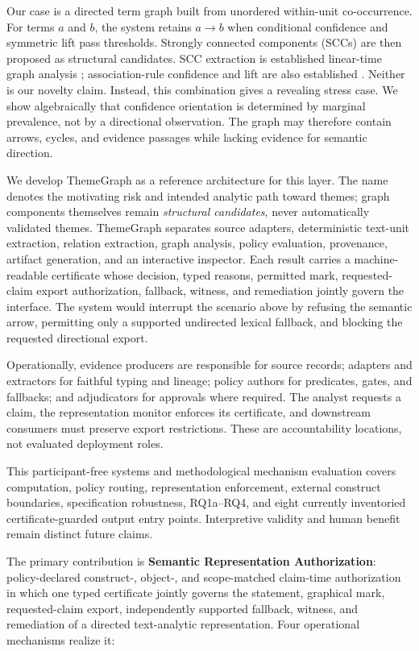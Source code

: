 \documentclass[manuscript,screen,review,anonymous]{acmart}
\begin{document}
Our case is a directed term graph built from unordered within-unit co-occurrence. For terms $a$ and $b$, the system retains $a\rightarrow b$ when conditional confidence and symmetric lift pass thresholds. Strongly connected components (SCCs) are then proposed as structural candidates. SCC extraction is established linear-time graph analysis \cite{tarjan1972}; association-rule confidence and lift are also established \cite{agrawal1993}. Neither is our novelty claim. Instead, this combination gives a revealing stress case. We show algebraically that confidence orientation is determined by marginal prevalence, not by a directional observation. The graph may therefore contain arrows, cycles, and evidence passages while lacking evidence for semantic direction.

We develop ThemeGraph as a reference architecture for this layer. The name denotes the motivating risk and intended analytic path toward themes; graph components themselves remain \emph{structural candidates}, never automatically validated themes. ThemeGraph separates source adapters, deterministic text-unit extraction, relation extraction, graph analysis, policy evaluation, provenance, artifact generation, and an interactive inspector. Each result carries a machine-readable certificate whose decision, typed reasons, permitted mark, requested-claim export authorization, fallback, witness, and remediation jointly govern the interface. The system would interrupt the scenario above by refusing the semantic arrow, permitting only a supported undirected lexical fallback, and blocking the requested directional export.

Operationally, evidence producers are responsible for source records; adapters and extractors for faithful typing and lineage; policy authors for predicates, gates, and fallbacks; and adjudicators for approvals where required. The analyst requests a claim, the representation monitor enforces its certificate, and downstream consumers must preserve export restrictions. These are accountability locations, not evaluated deployment roles.

This participant-free systems and methodological mechanism evaluation covers computation, policy routing, representation enforcement, external construct boundaries, specification robustness, RQ1a--RQ4, and eight currently inventoried certificate-guarded output entry points. Interpretive validity and human benefit remain distinct future claims.

The primary contribution is \textbf{Semantic Representation Authorization}: policy-declared construct-, object-, and scope-matched claim-time authorization in which one typed certificate jointly governs the statement, graphical mark, requested-claim export, independently supported fallback, witness, and remediation of a directed text-analytic representation. Four operational mechanisms realize it:
\end{document}
